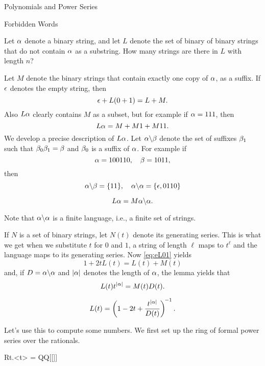 \begin{chap}{Polynomials and Power Series}
%
\begin{sect}{Forbidden Words}
%
\begin{para}
Let $\alpha$ denote a binary string, and let $L$ denote
the set of binary of binary strings that do not contain $\alpha$ as a substring. 
How many strings are there in $L$ with length $n$?
\end{para}
%
\begin{para}
Let $M$ denote the binary
strings that contain exactly one copy of $\alpha$, as a suffix. 
If $\epsilon$ denotes the empty string, then
\begin{equation}
    \label{eq:eL01}
    \epsilon+L(0+1) = L+M.
\end{equation}
Also $L\alpha$ clearly contains $M$ as a subset, but for example if $\alpha=111$,
then
\[
    L\alpha =M+M1+M11.
\]
We develop a precise description of $L\alpha$. Let $\alpha\backslash\beta$ denote the 
set of suffixes $\beta_1$ such that
$\beta_0\beta_1=\beta$ and $\beta_0$ is a suffix of $\alpha$. For example if
\[
    \alpha =100110,\quad \beta=1011,
\]
then
\[
    \alpha\backslash\beta = \{11\},\quad \alpha\backslash\alpha = \{\epsilon,0110\}
\]
%
\begin{lemma}
    \[
        L\alpha = M\alpha\backslash\alpha.
    \]
\end{lemma}
\end{para}
%
\begin{para}
Note that $\alpha\backslash\alpha$ is a finite language, i.e., a finite set of strings.
\end{para}
%
\begin{para}
If $N$ is a set of binary strings, let $N(t)$ denote its generating series.
This is what we get when we substitute $t$ for $0$ and $1$, a string of length
$\ell$ maps to $t^\ell$ and the language maps to its generating series.
Now \eqref{eq:eL01} yields
\[
    1+2t L(t) = L(t)+M(t)
\]
and, if $D=\alpha\backslash\alpha$ and $|\alpha|$ denotes the length of $\alpha$, 
the lemma yields that
\[
    L(t)t^{|\alpha|} = M(t) D(t).
\]
%
\begin{lemma}
    \[
        L(t) =\left(1-2t+\frac{t^{|\alpha|}}{D(t)}\right)^{\!-1}.
    \]
\end{lemma}
\end{para}
%
\begin{para}
Let's use this to compute some numbers. We first set up the ring of formal
power series over the rationals.
\end{para}
%
\begin{sageblock}
    Rt.<t> = QQ[[]]
\end{sageblock}

\end{sect}
\end{chap}
